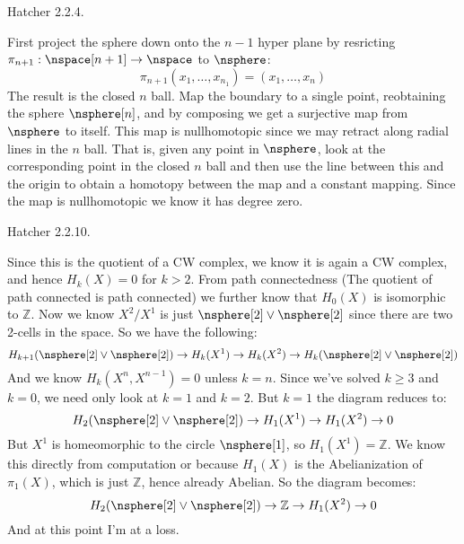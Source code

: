 \documentclass{book}                                                           %
\begin{document}
\begin{problem}
    Hatcher 2.2.4.
\end{problem}
\begin{solution}
    First project the sphere down onto the $n-1$ hyper plane by
    resricting $\pi_{n+1}:\nspace[n+1]\rightarrow\nspace$ to $\nsphere$:
    \begin{equation}
        \pi_{n+1}(x_{1},\dots,x_{n_1})=(x_{1},\dots,x_{n})
    \end{equation}
    The result is the closed $n$ ball. Map the boundary to a single point,
    reobtaining the sphere $\nsphere[n]$, and by composing we get a
    surjective map from $\nsphere$ to itself. This map is nullhomotopic
    since we may retract along radial lines in the $n$ ball. That is, given
    any point in $\nsphere$, look at the corresponding point in the closed
    $n$ ball and then use the line between this and the origin to obtain a
    homotopy between the map and a constant mapping. Since the map is
    nullhomotopic we know it has degree zero.
\end{solution}
\begin{problem}
    Hatcher 2.2.10.
\end{problem}
\begin{solution}
    Since this is the quotient of a CW complex, we know it is again a CW
    complex, and hence $H_{k}(X)=0$ for $k>2$. From path connectedness
    (The quotient of path connected is path connected) we further know that
    $H_{0}(X)$ is isomorphic to $\mathbb{Z}$. Now we know $X^{2}/X^{1}$ is
    just $\nsphere[2]\lor\nsphere[2]$ since there are two 2-cells in the
    space. So we have the following:
    \begin{equation}
        H_{k+1}(\nsphere[2]\lor\nsphere[2])\rightarrow
        H_{k}(X^{1})\rightarrow{H}_{k}(X^{2})
        \rightarrow{H}_{k}(\nsphere[2]\lor\nsphere[2])
    \end{equation}
    And we know $H_{k}(X^{n},X^{n-1})=0$ unless $k=n$. Since we've solved
    $k\geq{3}$ and $k=0$, we need only look at $k=1$ and $k=2$. But $k=1$
    the diagram reduces to:
    \begin{equation}
        H_{2}(\nsphere[2]\lor\nsphere[2])\rightarrow
        H_{1}(X^{1})\rightarrow
        H_{1}(X^{2})\rightarrow{0}
    \end{equation}
    But $X^{1}$ is homeomorphic to the circle $\nsphere[1]$, so
    $H_{1}(X^{1})=\mathbb{Z}$. We know this directly from computation or
    because $H_{1}(X)$ is the Abelianization of $\pi_{1}(X)$, which is just
    $\mathbb{Z}$, hence already Abelian. So the diagram becomes:
    \begin{equation}
        H_{2}(\nsphere[2]\lor\nsphere[2])\rightarrow
        \mathbb{Z}\rightarrow
        H_{1}(X^{2})\rightarrow{0}
    \end{equation}
    And at this point I'm at a loss.
\end{solution}
\end{document}
